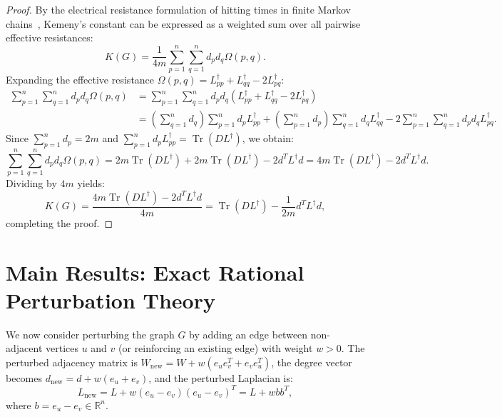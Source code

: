 \documentclass[11pt,a4paper]{article}
\theoremstyle{plain}
\theoremstyle{definition}
\begin{document}
\begin{proof}
By the electrical resistance formulation of hitting times in finite Markov chains~\cite{doyle1984random,hunter2014role}, Kemeny's constant can be expressed as a weighted sum over all pairwise effective resistances:
\begin{equation}
    K(G) = \frac{1}{4m} \sum_{p=1}^n \sum_{q=1}^n d_p d_q \Omega(p, q).
\end{equation}
Expanding the effective resistance $\Omega(p, q) = L^\dagger_{pp} + L^\dagger_{qq} - 2 L^\dagger_{pq}$:
\begin{align}
    \sum_{p=1}^n \sum_{q=1}^n d_p d_q \Omega(p, q) &= \sum_{p=1}^n \sum_{q=1}^n d_p d_q (L^\dagger_{pp} + L^\dagger_{qq} - 2 L^\dagger_{pq}) \nonumber \\
    &= \left(\sum_{q=1}^n d_q\right) \sum_{p=1}^n d_p L^\dagger_{pp} + \left(\sum_{p=1}^n d_p\right) \sum_{q=1}^n d_q L^\dagger_{qq} - 2 \sum_{p=1}^n \sum_{q=1}^n d_p d_q L^\dagger_{pq}.
\end{align}
Since $\sum_{p=1}^n d_p = 2m$ and $\sum_{p=1}^n d_p L^\dagger_{pp} = \operatorname{Tr}(D L^\dagger)$, we obtain:
\begin{equation}
    \sum_{p=1}^n \sum_{q=1}^n d_p d_q \Omega(p, q) = 2m \operatorname{Tr}(D L^\dagger) + 2m \operatorname{Tr}(D L^\dagger) - 2 d^T L^\dagger d = 4m \operatorname{Tr}(D L^\dagger) - 2 d^T L^\dagger d.
\end{equation}
Dividing by $4m$ yields:
\begin{equation}
    K(G) = \frac{4m \operatorname{Tr}(D L^\dagger) - 2 d^T L^\dagger d}{4m} = \operatorname{Tr}(D L^\dagger) - \frac{1}{2m} d^T L^\dagger d,
\end{equation}
completing the proof.
\end{proof}

\section{Main Results: Exact Rational Perturbation Theory}
\label{sec:main_results}

We now consider perturbing the graph $G$ by adding an edge between non-adjacent vertices $u$ and $v$ (or reinforcing an existing edge) with weight $w > 0$. The perturbed adjacency matrix is $W_{\mathrm{new}} = W + w (e_u e_v^T + e_v e_u^T)$, the degree vector becomes $d_{\mathrm{new}} = d + w(e_u + e_v)$, and the perturbed Laplacian is:
\begin{equation}
    L_{\mathrm{new}} = L + w (e_u - e_v)(e_u - e_v)^T = L + w b b^T,
\end{equation}
where $b = e_u - e_v \in \mathbb{R}^n$.
\end{document}
